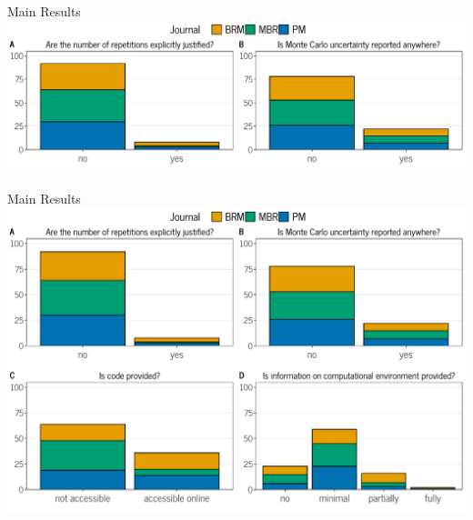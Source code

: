 \documentclass[english, 12pt, aspectratio=169]{beamer}
\begin{document}
\begin{frame}{Main Results}
\pause
   \includegraphics{pics/fig1_part1.pdf}
\end{frame}


\begin{frame}{Main Results}
   \includegraphics{pics/review-results.pdf}
\end{frame}
\end{document}
